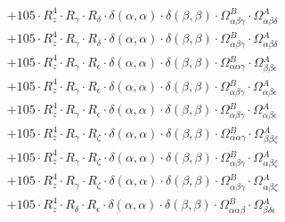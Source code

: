 \documentclass{article}
\begin{document}
\begin{subequations}
\begin{gather}
\begin{array}{c}
 \\[0.2em] 		 + 105 \cdot R_{z}^{4} \cdot R_{\gamma{}} \cdot R_{\delta{}} \cdot \delta{}\left(\alpha{}, \alpha{}\right) \cdot \delta{}\left(\beta{}, \beta{}\right) \cdot \Omega{}^{B}_{\alpha{}\beta{}\gamma{}} \cdot \Omega{}^{A}_{\alpha{}\beta{}\delta{}} 
 \\[0.2em] 		 + 105 \cdot R_{z}^{4} \cdot R_{\gamma{}} \cdot R_{\delta{}} \cdot \delta{}\left(\alpha{}, \alpha{}\right) \cdot \delta{}\left(\beta{}, \beta{}\right) \cdot \Omega{}^{B}_{\alpha{}\beta{}\gamma{}} \cdot \Omega{}^{A}_{\alpha{}\beta{}\delta{}} 
 \\[0.2em] 		 + 105 \cdot R_{z}^{4} \cdot R_{\gamma{}} \cdot R_{\epsilon{}} \cdot \delta{}\left(\alpha{}, \alpha{}\right) \cdot \delta{}\left(\beta{}, \beta{}\right) \cdot \Omega{}^{B}_{\alpha{}\alpha{}\gamma{}} \cdot \Omega{}^{A}_{\beta{}\beta{}\epsilon{}} 
 \\[0.2em] 		 + 105 \cdot R_{z}^{4} \cdot R_{\gamma{}} \cdot R_{\epsilon{}} \cdot \delta{}\left(\alpha{}, \alpha{}\right) \cdot \delta{}\left(\beta{}, \beta{}\right) \cdot \Omega{}^{B}_{\alpha{}\beta{}\gamma{}} \cdot \Omega{}^{A}_{\alpha{}\beta{}\epsilon{}} 
 \\[0.2em] 		 + 105 \cdot R_{z}^{4} \cdot R_{\gamma{}} \cdot R_{\epsilon{}} \cdot \delta{}\left(\alpha{}, \alpha{}\right) \cdot \delta{}\left(\beta{}, \beta{}\right) \cdot \Omega{}^{B}_{\alpha{}\beta{}\gamma{}} \cdot \Omega{}^{A}_{\alpha{}\beta{}\epsilon{}} 
 \\[0.2em] 		 + 105 \cdot R_{z}^{4} \cdot R_{\gamma{}} \cdot R_{\zeta{}} \cdot \delta{}\left(\alpha{}, \alpha{}\right) \cdot \delta{}\left(\beta{}, \beta{}\right) \cdot \Omega{}^{B}_{\alpha{}\alpha{}\gamma{}} \cdot \Omega{}^{A}_{\beta{}\beta{}\zeta{}} 
 \\[0.2em] 		 + 105 \cdot R_{z}^{4} \cdot R_{\gamma{}} \cdot R_{\zeta{}} \cdot \delta{}\left(\alpha{}, \alpha{}\right) \cdot \delta{}\left(\beta{}, \beta{}\right) \cdot \Omega{}^{B}_{\alpha{}\beta{}\gamma{}} \cdot \Omega{}^{A}_{\alpha{}\beta{}\zeta{}} 
 \\[0.2em] 		 + 105 \cdot R_{z}^{4} \cdot R_{\gamma{}} \cdot R_{\zeta{}} \cdot \delta{}\left(\alpha{}, \alpha{}\right) \cdot \delta{}\left(\beta{}, \beta{}\right) \cdot \Omega{}^{B}_{\alpha{}\beta{}\gamma{}} \cdot \Omega{}^{A}_{\alpha{}\beta{}\zeta{}} 
 \\[0.2em] 		 + 105 \cdot R_{z}^{4} \cdot R_{\delta{}} \cdot R_{\epsilon{}} \cdot \delta{}\left(\alpha{}, \alpha{}\right) \cdot \delta{}\left(\beta{}, \beta{}\right) \cdot \Omega{}^{B}_{\alpha{}\alpha{}\beta{}} \cdot \Omega{}^{A}_{\beta{}\delta{}\epsilon{}} 

\end{array}
\end{gather}
\end{subequations}
\end{document}

